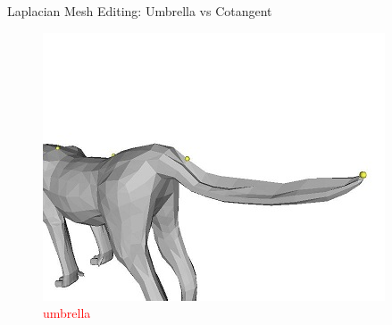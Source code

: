 \documentclass{beamer}
\begin{document}
\begin{frame}{Laplacian Mesh Editing: Umbrella vs Cotangent}

\begin{figure}
\begin{minipage}{0.45\textwidth}
    \includegraphics[width=\textwidth]{cheetahtail_umbrella.jpg}
    \caption{\textcolor{red}{umbrella}}
\end{minipage}
\end{figure}

\end{frame}
\end{document}
